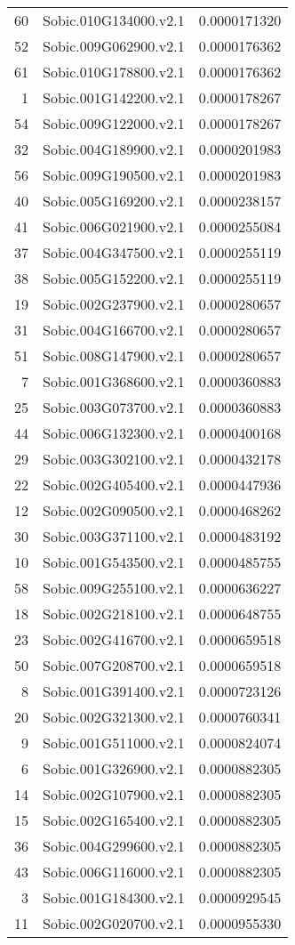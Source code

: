\documentclass[12pt, a4paper]{article}
\begin{document}
\begin{table}[ht]
\begin{tabular}{rlr}
  60 & Sobic.010G134000.v2.1 & 0.0000171320 \\ 
  52 & Sobic.009G062900.v2.1 & 0.0000176362 \\ 
  61 & Sobic.010G178800.v2.1 & 0.0000176362 \\ 
  1 & Sobic.001G142200.v2.1 & 0.0000178267 \\ 
  54 & Sobic.009G122000.v2.1 & 0.0000178267 \\ 
  32 & Sobic.004G189900.v2.1 & 0.0000201983 \\ 
  56 & Sobic.009G190500.v2.1 & 0.0000201983 \\ 
  40 & Sobic.005G169200.v2.1 & 0.0000238157 \\ 
  41 & Sobic.006G021900.v2.1 & 0.0000255084 \\ 
  37 & Sobic.004G347500.v2.1 & 0.0000255119 \\ 
  38 & Sobic.005G152200.v2.1 & 0.0000255119 \\ 
  19 & Sobic.002G237900.v2.1 & 0.0000280657 \\ 
  31 & Sobic.004G166700.v2.1 & 0.0000280657 \\ 
  51 & Sobic.008G147900.v2.1 & 0.0000280657 \\ 
  7 & Sobic.001G368600.v2.1 & 0.0000360883 \\ 
  25 & Sobic.003G073700.v2.1 & 0.0000360883 \\ 
  44 & Sobic.006G132300.v2.1 & 0.0000400168 \\ 
  29 & Sobic.003G302100.v2.1 & 0.0000432178 \\ 
  22 & Sobic.002G405400.v2.1 & 0.0000447936 \\ 
  12 & Sobic.002G090500.v2.1 & 0.0000468262 \\ 
  30 & Sobic.003G371100.v2.1 & 0.0000483192 \\ 
  10 & Sobic.001G543500.v2.1 & 0.0000485755 \\ 
  58 & Sobic.009G255100.v2.1 & 0.0000636227 \\ 
  18 & Sobic.002G218100.v2.1 & 0.0000648755 \\ 
  23 & Sobic.002G416700.v2.1 & 0.0000659518 \\ 
  50 & Sobic.007G208700.v2.1 & 0.0000659518 \\ 
  8 & Sobic.001G391400.v2.1 & 0.0000723126 \\ 
  20 & Sobic.002G321300.v2.1 & 0.0000760341 \\ 
  9 & Sobic.001G511000.v2.1 & 0.0000824074 \\ 
  6 & Sobic.001G326900.v2.1 & 0.0000882305 \\ 
  14 & Sobic.002G107900.v2.1 & 0.0000882305 \\ 
  15 & Sobic.002G165400.v2.1 & 0.0000882305 \\ 
  36 & Sobic.004G299600.v2.1 & 0.0000882305 \\ 
  43 & Sobic.006G116000.v2.1 & 0.0000882305 \\ 
  3 & Sobic.001G184300.v2.1 & 0.0000929545 \\ 
  11 & Sobic.002G020700.v2.1 & 0.0000955330 \\ 
   \hline
\end{tabular}
\end{table}
\end{document}

